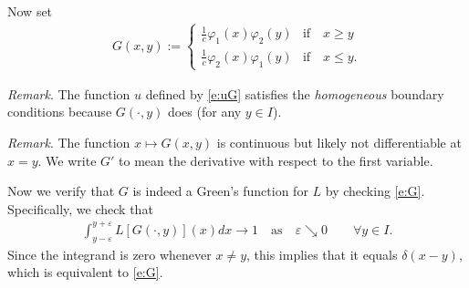 \documentclass[12pt,a4paper]{article}
\begin{document}
    
    Now set
    \begin{align}
        G(x, y)
        :=
        \begin{cases}
            \frac1c \varphi_1(x) \varphi_2(y) & \text{if} \quad x \geq y
            \\
            \frac1c \varphi_2(x) \varphi_1(y) & \text{if} \quad x \leq y
            .
        \end{cases}
    \end{align}
    
    

    
    \emph{Remark}.
    The function $u$ defined by \eqref{e:uG}
    satisfies the \emph{homogeneous} boundary conditions
    because
    $G(\cdot, y)$ does (for any $y \in I$).
    
    
    \emph{Remark}.
    The function $x \mapsto G(x, y)$ is 
    continuous but likely not differentiable at $x = y$.
    We write $G'$ to mean the derivative 
    with respect to the first variable.
    
    
    Now we verify that $G$ is indeed a Green's function 
    for $L$ by checking \eqref{e:G}.
    Specifically, we check that
    \begin{align}
        \label{e:?}
        \int_{y - \varepsilon}^{y + \varepsilon}
        L [G(\cdot, y)](x) dx
        \to
        1
        \quad \text{as} \quad
        \varepsilon \searrow 0
        \qquad
        \forall y \in I
        .
    \end{align}
    Since the integrand is zero whenever $x \neq y$,
    this implies that it equals $\delta(x - y)$,
    which is equivalent to \eqref{e:G}.

    
    \newcommand{\x}{{\color{Brown}x}}
    \newcommand{\y}{{y}}
    
\end{document}
